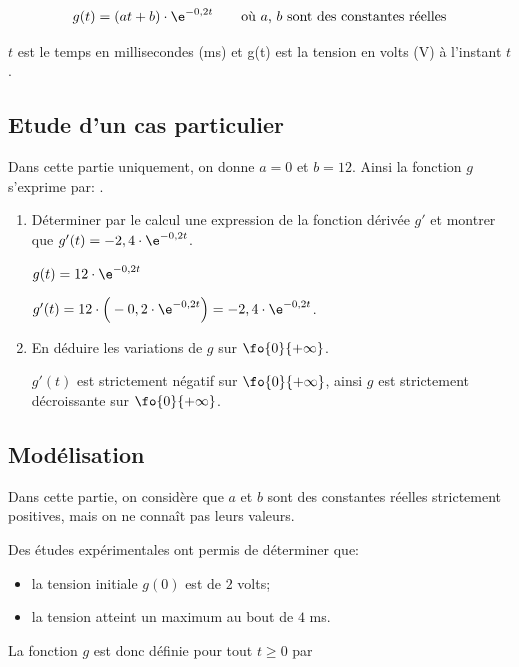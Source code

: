\[g(t)=(at+b)\cdot \e^{-0,2t}\qquad \text{où $a$, $b$ sont des constantes réelles}\]

     $t$ est le temps en millisecondes (ms) et     g(t) est la tension en volts (V) à l'instant $t$.

\subsection*{Etude d'un cas particulier}

    Dans cette partie uniquement, on donne $a=0$ et $b=12$. Ainsi la fonction $g$ s'exprime par: .

    
\begin{enumerate}[series=monDS, resume]
    \item Déterminer par le calcul une expression de la fonction dérivée $g'$ et montrer que $g'(t)=-2,4\cdot \e^{-0,2t}$.
    \begin{blocvisiblex}[height=2.5]
    {\quad}
    $g(t)= 12 \cdot \e^{-0,2t}$

    $g'(t)= 12 \cdot \Big(-0,2\cdot \e^{-0,2t}\Big)=-2,4\cdot \e^{-0,2t}$.
    \end{blocvisiblex}
    \medskip
    \item En déduire les variations de $g$ sur $\fo{0}{+\infty}$.
    \begin{blocvisiblex}[height=2.5]
    {\quad}
    $g'(t)$ est strictement négatif sur $\fo{0}{+\infty}$, ainsi $g$ est strictement décroissante sur $\fo{0}{+\infty}$.
    \end{blocvisiblex}

\end{enumerate}


\subsection*{Modélisation}

Dans cette partie, on considère que $a$ et $b$ sont des constantes réelles strictement positives, mais on ne connaît pas leurs valeurs.

Des études expérimentales ont permis de déterminer que:
\begin{itemize}
    \item la tension initiale $g(0)$ est de $2$ volts;
    \item la tension atteint un maximum au bout de $4$ ms.
\end{itemize}

La fonction $g$ est donc définie pour tout $t\geq 0$ par 

